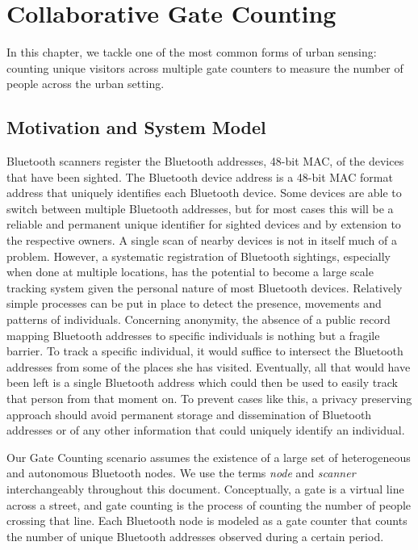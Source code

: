 \chapter{Collaborative Gate Counting}
\label{cha:gate-counting}

In this chapter, we tackle one of the most common forms of urban
sensing: counting unique visitors across multiple gate counters to
measure the number of people across the urban setting.

\section {Motivation and System Model}
\label{sec:motivation}

Bluetooth scanners register the Bluetooth addresses, 48-bit MAC, of
the devices that have been sighted. The Bluetooth device address is a
48-bit MAC format address that uniquely identifies each Bluetooth
device. Some devices are able to switch between multiple Bluetooth
addresses, but for most cases this will be a reliable and permanent
unique identifier for sighted devices and by extension to the
respective owners. A single scan of nearby devices is not in itself
much of a problem. However, a systematic registration of Bluetooth
sightings, especially when done at multiple locations, has the
potential to become a large scale tracking system given the personal
nature of most Bluetooth devices. Relatively simple processes can be
put in place to detect the presence, movements and patterns of
individuals. Concerning anonymity, the absence of a public record
mapping Bluetooth addresses to specific individuals is nothing but a
fragile barrier. To track a specific individual, it would suffice to
intersect the Bluetooth addresses from some of the places she has
visited. Eventually, all that would have been left is a single
Bluetooth address which could then be used to easily track that person
from that moment on. To prevent cases like this, a privacy preserving
approach should avoid permanent storage and dissemination of Bluetooth
addresses or of any other information that could uniquely identify an
individual.

Our Gate Counting scenario assumes the existence of a large set
of heterogeneous and autonomous Bluetooth nodes. We use the terms
\emph{node} and \emph{scanner} interchangeably throughout this document.
Conceptually, a gate is a virtual line across a street, and gate
counting is the process of counting the number of people crossing that
line. Each Bluetooth node is modeled as a gate counter that counts the
number of unique Bluetooth addresses observed during a certain period.

